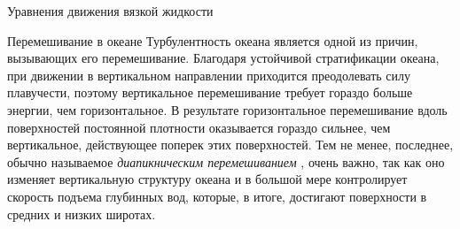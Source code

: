\begin{chapter}{Уравнения движения вязкой жидкости}
\begin{section}{Перемешивание в океане}\label{sec:MixingInOcean}
 
Турбулентность океана является одной из причин, вызывающих его перемешивание. 
Благодаря устойчивой 
стратификации океана, при движении в вертикальном направлении приходится
преодолевать силу плавучести, поэтому вертикальное 
перемешивание требует гораздо больше энергии, чем горизонтальное. В результате
горизонтальное перемешивание вдоль поверхностей постоянной плотности 
оказывается гораздо сильнее, чем вертикальное, действующее поперек этих 
поверхностей. Тем не менее, последнее, обычно называемое 
\emph{диапикническим перемешиванием}%
, очень важно, так как оно
изменяет вертикальную структуру океана и в большой мере контролирует
скорость подъема глубинных вод, которые, в итоге, достигают
поверхности в средних и низких широтах.
%


\end{section}
\end{chapter}

